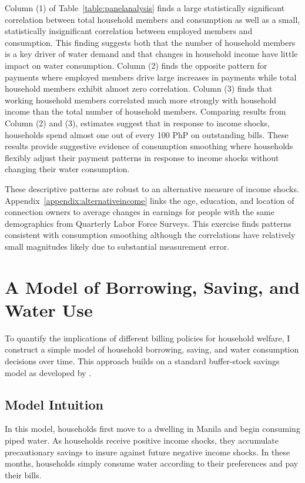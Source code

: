 \documentclass[12pt,table]{article}
\begin{document}
Column (1) of Table~\ref{table:panelanalysis} finds a large statistically significant correlation between total household members and consumption as well as a small, statistically insignificant correlation between employed members and consumption.  This finding suggests both that the number of household members is a key driver of water demand and that changes in household income have little impact on water consumption.  Column (2) finds the opposite pattern for payments where employed members drive large increases in payments while total household members exhibit almost zero correlation.  Column (3) finds that working household members correlated much more strongly with household income than the total number of household members.  Comparing results from Column (2) and (3), estimates suggest that in response to income shocks, households spend almost one out of every 100 PhP on outstanding bills.  These results provide suggestive evidence of consumption smoothing where households flexibly adjust their payment patterns in response to income shocks without changing their water consumption.  

These descriptive patterns are robust to an alternative measure of income shocks.  Appendix~\ref{appendix:alternativeincome} links the age, education, and location of connection owners to average changes in earnings for people with the same demographics from Quarterly Labor Force Surveys.  This exercise finds patterns consistent with consumption smoothing although the correlations have relatively small magnitudes likely due to substantial measurement error.


\section{A Model of Borrowing, Saving, and Water Use}\label{section:model}

To quantify the implications of different billing policies for household welfare, I construct a simple model of household borrowing, saving, and water consumption decisions over time.  This approach builds on a standard buffer-stock savings model as developed by \cite{deaton1991saving}.

\subsection{Model Intuition}

In this model, households first move to a dwelling in Manila and begin consuming piped water.  As households receive positive income shocks, they accumulate precautionary savings to insure against future negative income shocks.  In these months, households simply consume water according to their preferences and pay their bills.
\end{document}
